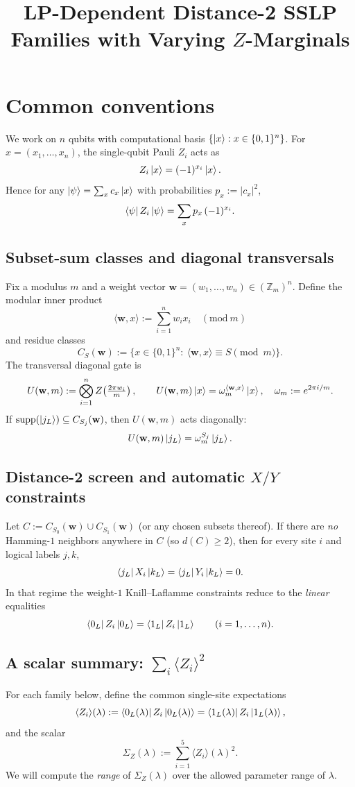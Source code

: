 \documentclass[11pt]{article}
\title{LP-Dependent Distance-2 SSLP Families with Varying \texorpdfstring{$Z$}{Z}-Marginals}
\author{}
\date{}
\begin{document}
\maketitle
\tableofcontents

\section{Common conventions}

We work on $n$ qubits with computational basis $\{\ket{x}:x\in\{0,1\}^n\}$.
For $x=(x_1,\dots,x_n)$, the single-qubit Pauli $Z_i$ acts as
\[
Z_i\ket{x}=(-1)^{x_i}\ket{x}.
\]
Hence for any $\ket{\psi}=\sum_x c_x\ket{x}$ with probabilities $p_x:=|c_x|^2$,
\begin{equation}
\label{eq:Zi-diagonal}
\bra{\psi}Z_i\ket{\psi}=\sum_x p_x\,(-1)^{x_i}.
\end{equation}

\subsection{Subset-sum classes and diagonal transversals}
Fix a modulus $m$ and a weight vector $\mathbf w=(w_1,\dots,w_n)\in(\mathbb Z_m)^n$.
Define the modular inner product
\[
\langle \mathbf w,x\rangle := \sum_{i=1}^n w_i x_i\quad (\mathrm{mod}\ m)
\]
and residue classes
\[
C_S(\mathbf w):=\bigl\{x\in\{0,1\}^n:\ \langle \mathbf w,x\rangle\equiv S \pmod m\bigr\}.
\]
The transversal diagonal gate is
\[
U(\mathbf w,m):=\bigotimes_{i=1}^n Z\!\left(\tfrac{2\pi w_i}{m}\right),
\qquad
U(\mathbf w,m)\ket{x}=\omega_m^{\langle \mathbf w,x\rangle}\ket{x},
\quad
\omega_m:=e^{2\pi i/m}.
\]
If $\mathrm{supp}(\ket{j_L})\subseteq C_{S_j}(\mathbf w)$, then $U(\mathbf w,m)$ acts diagonally:
\[
U(\mathbf w,m)\ket{j_L}=\omega_m^{S_j}\ket{j_L}.
\]

\subsection{Distance-2 screen and automatic $X/Y$ constraints}
Let $C:=C_{S_0}(\mathbf w)\cup C_{S_1}(\mathbf w)$ (or any chosen subsets thereof).
If there are \emph{no} Hamming-$1$ neighbors anywhere in $C$ (so $d(C)\ge 2$), then
for every site $i$ and logical labels $j,k$,
\[
\bra{j_L}X_i\ket{k_L}=\bra{j_L}Y_i\ket{k_L}=0.
\]
In that regime the weight-$1$ Knill--Laflamme constraints reduce to the \emph{linear}
equalities
\[
\bra{0_L}Z_i\ket{0_L}=\bra{1_L}Z_i\ket{1_L}\qquad(i=1,\dots,n).
\]

\subsection{A scalar summary: \texorpdfstring{$\sum_i \langle Z_i\rangle^2$}{sum of Zi squares}}
For each family below, define the common single-site expectations
\[
\langle Z_i\rangle(\lambda):=\bra{0_L(\lambda)}Z_i\ket{0_L(\lambda)}
=\bra{1_L(\lambda)}Z_i\ket{1_L(\lambda)},
\]
and the scalar
\begin{equation}
\label{eq:SigmaZdef}
\Sigma_Z(\lambda):=\sum_{i=1}^5 \langle Z_i\rangle(\lambda)^2.
\end{equation}
We will compute the \emph{range} of $\Sigma_Z(\lambda)$ over the allowed parameter range of $\lambda$.
\end{document}
